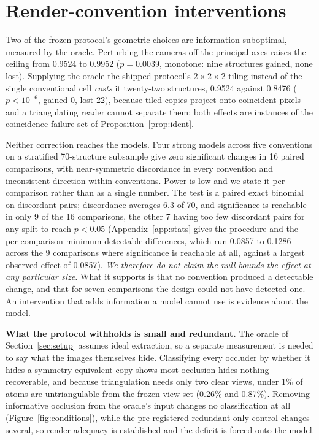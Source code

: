 \section{Render-convention interventions}
\label{sec:conventions}

Two of the frozen protocol's geometric choices are information-suboptimal, measured by the oracle.
Perturbing the cameras off the principal axes raises the ceiling from 0.9524 to 0.9952 ($p = 0.0039$,
monotone: nine structures gained, none lost). Supplying the oracle the shipped protocol's $2\times2\times2$ tiling instead of the single conventional cell
\emph{costs} it twenty-two structures, 0.9524 against 0.8476 ($p < 10^{-6}$, gained 0, lost 22), because
tiled copies project onto coincident pixels and a triangulating reader cannot separate them; both effects are instances
of the coincidence failure set of Proposition~\ref{prop:ident}.

Neither correction reaches the models. Four strong models across five conventions on a stratified
70-structure subsample give zero significant changes in 16 paired comparisons, with near-symmetric
discordance in every convention and inconsistent direction within conventions. Power is low and we state it
per comparison rather than as a single number. The test is a paired exact binomial on discordant pairs;
discordance averages 6.3 of 70, and significance is reachable in only 9 of the 16 comparisons, the other 7
having too few discordant pairs for any split to reach $p<0.05$ (Appendix~\ref{app:stats} gives the
procedure and the per-comparison minimum detectable differences, which run 0.0857 to 0.1286 across the 9
comparisons where significance is reachable at all, against a largest observed effect of 0.0857). \emph{We therefore do not claim the null bounds the effect at any
particular size.} What it supports is that no convention produced a detectable change, and that for seven
comparisons the design could not have detected one. An intervention that adds information a model cannot
use is evidence about the model.

\textbf{What the protocol withholds is small and redundant.} The oracle of Section~\ref{sec:setup} assumes
ideal extraction, so a separate measurement is needed to say what the images themselves hide. Classifying
every occluder by whether it hides a symmetry-equivalent copy shows most occlusion hides nothing
recoverable, and because triangulation needs only two clear views, under 1\% of atoms are untriangulable
from the frozen view set (0.26\% and 0.87\%).
Removing informative occlusion from the oracle's input changes no classification at all
(Figure~\ref{fig:conditions}), while the pre-registered redundant-only control changes several, so render
adequacy is established and the deficit is forced onto the model.
